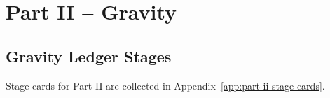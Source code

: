 \part{Part II -- Gravity}

\chapter{Gravity Ledger Stages}

Stage cards for Part II are collected in Appendix~\ref{app:part-ii-stage-cards}.
